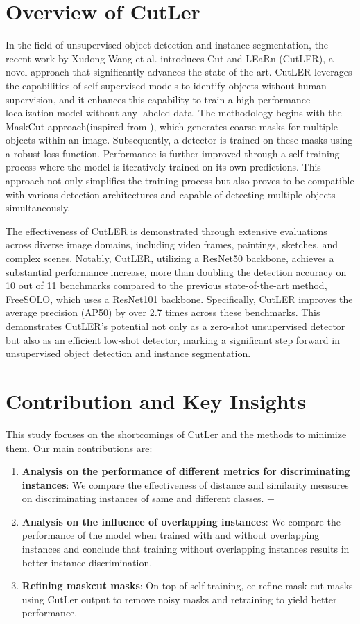 \section{Overview of CutLer}
In the field of unsupervised object detection and instance segmentation, the recent work by Xudong Wang et al. introduces Cut-and-LEaRn (CutLER)\cite{wang2023cut}, a novel approach that significantly advances the state-of-the-art. CutLER leverages the capabilities of self-supervised models to identify objects without human supervision, and it enhances this capability to train a high-performance localization model without any labeled data. The methodology begins with the MaskCut approach(inspired from \cite{wang2022tokencut}), which generates coarse masks for multiple objects within an image. Subsequently, a detector is trained on these masks using a robust loss function. Performance is further improved through a self-training process where the model is iteratively trained on its own predictions. This approach not only simplifies the training process but also proves to be compatible with various detection architectures and capable of detecting multiple objects simultaneously.

The effectiveness of CutLER is demonstrated through extensive evaluations across diverse image domains, including video frames, paintings, sketches, and complex scenes. Notably, CutLER, utilizing a ResNet50 backbone, achieves a substantial performance increase, more than doubling the detection accuracy on 10 out of 11 benchmarks compared to the previous state-of-the-art method, FreeSOLO, which uses a ResNet101 backbone. Specifically, CutLER improves the average precision (AP50) by over 2.7 times across these benchmarks. This demonstrates CutLER's potential not only as a zero-shot unsupervised detector but also as an efficient low-shot detector, marking a significant step forward in unsupervised object detection and instance segmentation.

\section{Contribution and Key Insights}

This study focuses on the shortcomings of CutLer and the methods to minimize them. Our main contributions are:

\begin{enumerate}
    \item \textbf{Analysis on the performance of different metrics for discriminating instances}: We compare the effectiveness of distance and similarity measures on discriminating instances of same and different classes.
    +
    \item \textbf{Analysis on the influence of overlapping instances}: We compare the performance of the model when trained with and without overlapping instances and conclude that training without overlapping instances results in better instance discrimination.

    \item \textbf{Refining maskcut masks}: On top of self training, ee refine mask-cut masks using CutLer output to remove noisy masks and retraining to yield better performance.
\end{enumerate}

